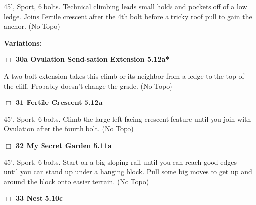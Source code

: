 \begin{multicols}{2}
\begin{adjustwidth}{1.3em}{}
45', Sport, 6 bolts. Technical climbing leads small holds and pockets off of a low ledge. Joins Fertile crescent after the 4th bolt before a tricky roof pull to gain the anchor.
  (No Topo)
\end{adjustwidth}


\begin{adjustwidth}{0.5cm}{}				
\needspace{4em}
\textbf{Variations:} \newline

\needspace{2em}
\label{vr:Ovulation Send-sation Extension}
\colorbox{Goldenrod!20}{
\parbox{0.95\linewidth}{
\hspace{-1ex}\textbf{$\Box$
30a Ovulation Send-sation Extension 5.12a*  
}}}
\begin{adjustwidth}{1.3em}{}			

A two bolt extension takes this climb or its neighbor from a ledge to the top of the cliff. Probably doesn't change the grade.
  (No Topo)
\end{adjustwidth}



\end{adjustwidth}


\needspace{2em}
\label{rt:Fertile Crescent}
\colorbox{Goldenrod!20}{
\parbox{0.95\linewidth}{
\hspace{-1ex}\textbf{$\Box$
31 Fertile Crescent 5.12a  
}}}
\begin{adjustwidth}{1.3em}{}			

45', Sport, 6 bolts. Climb the large left facing crescent feature until you join with Ovulation after the fourth bolt.
  (No Topo)
\end{adjustwidth}




\needspace{2em}
\label{rt:My Secret Garden}
\colorbox{RoyalBlue!20}{
\parbox{0.95\linewidth}{
\hspace{-1ex}\textbf{$\Box$
32 My Secret Garden 5.11a  
}}}
\begin{adjustwidth}{1.3em}{}			

45', Sport, 6 bolts. Start on a big sloping rail until you can reach good edges until you can stand up under a hanging block. Pull some big moves to get up and around the block onto easier terrain.
  (No Topo)
\end{adjustwidth}




\needspace{2em}
\label{rt:Nest}
\colorbox{RoyalBlue!20}{
\parbox{0.95\linewidth}{
\hspace{-1ex}\textbf{$\Box$
33 Nest 5.10c  
}}}
\begin{adjustwidth}{1.3em}{}			


\end{adjustwidth}
\end{multicols}
